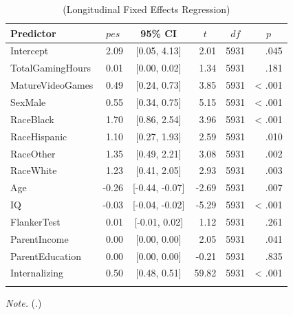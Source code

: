 \documentclass{article}
\begin{document}
\begin{table}[tbp]

\begin{center}
\begin{threeparttable}

\caption{\label{tab:FEreg}(Longitudinal Fixed Effects Regression)}

\begin{tabular}{lrcrrr}
\toprule
Predictor & \multicolumn{1}{c}{$pes$} & \multicolumn{1}{c}{95\% CI} & \multicolumn{1}{c}{$t$} & \multicolumn{1}{c}{$\mathit{df}$} & \multicolumn{1}{c}{$p$}\\
\midrule
Intercept & 2.09 & {}[0.05, 4.13] & 2.01 & 5931 & .045\\
TotalGamingHours & 0.01 & {}[0.00, 0.02] & 1.34 & 5931 & .181\\
MatureVideoGames & 0.49 & {}[0.24, 0.73] & 3.85 & 5931 & < .001\\
SexMale & 0.55 & {}[0.34, 0.75] & 5.15 & 5931 & < .001\\
RaceBlack & 1.70 & {}[0.86, 2.54] & 3.96 & 5931 & < .001\\
RaceHispanic & 1.10 & {}[0.27, 1.93] & 2.59 & 5931 & .010\\
RaceOther & 1.35 & {}[0.49, 2.21] & 3.08 & 5931 & .002\\
RaceWhite & 1.23 & {}[0.41, 2.05] & 2.93 & 5931 & .003\\
Age & -0.26 & {}[-0.44, -0.07] & -2.69 & 5931 & .007\\
IQ & -0.03 & {}[-0.04, -0.02] & -5.29 & 5931 & < .001\\
FlankerTest & 0.01 & {}[-0.01, 0.02] & 1.12 & 5931 & .261\\
ParentIncome & 0.00 & {}[0.00, 0.00] & 2.05 & 5931 & .041\\
ParentEducation & 0.00 & {}[0.00, 0.00] & -0.21 & 5931 & .835\\
Internalizing & 0.50 & {}[0.48, 0.51] & 59.82 & 5931 & < .001\\
\bottomrule
\addlinespace
\end{tabular}

\begin{tablenotes}[para]
\normalsize{\textit{Note.} (.)}
\end{tablenotes}

\end{threeparttable}
\end{center}

\end{table}
\end{document}
